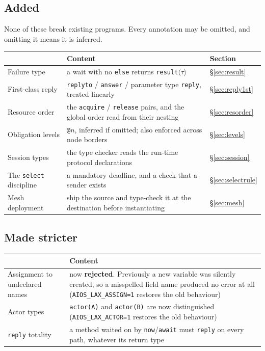 \documentclass[11pt,a4paper]{article}
\begin{document}
\subsection{Added}

None of these break existing programs. Every annotation may be omitted, and
omitting it means it is inferred.

\begin{center}
\small
\begin{tabular}{@{}lp{7.4cm}l@{}}
\toprule
 & Content & Section \\
\midrule
Failure type & a wait with no \texttt{else} returns \texttt{result}$\langle\tau\rangle$
  & \S\ref{sec:result} \\
First-class reply & \texttt{replyto} / \texttt{answer} / parameter type \texttt{reply}, treated linearly
  & \S\ref{sec:reply1st} \\
Resource order & the \texttt{acquire} / \texttt{release} pairs, and the global order read from their nesting
  & \S\ref{sec:resorder} \\
Obligation levels & \texttt{@$n$}, inferred if omitted; also enforced across node borders
  & \S\ref{sec:levels} \\
Session types & the type checker reads the run-time protocol declarations
  & \S\ref{sec:session} \\
The \texttt{select} discipline & a mandatory deadline, and a check that a sender exists
  & \S\ref{sec:selectrule} \\
Mesh deployment & ship the source and type-check it at the destination before instantiating
  & \S\ref{sec:mesh} \\
\bottomrule
\end{tabular}
\end{center}

\subsection{Made stricter}

\begin{center}
\small
\begin{tabular}{@{}lp{8.6cm}@{}}
\toprule
 & Content \\
\midrule
Assignment to undeclared names & now \textbf{rejected}. Previously a new
  variable was silently created, so a misspelled field name produced no error
  at all (\texttt{AIOS\_LAX\_ASSIGN=1} restores the old behaviour) \\
Actor types & \texttt{actor(A)} and \texttt{actor(B)} are now distinguished
  (\texttt{AIOS\_LAX\_ACTOR=1} restores the old behaviour) \\
\texttt{reply} totality & a method waited on by \texttt{now}/\texttt{await}
  must \texttt{reply} on every path, whatever its return type \\
\bottomrule
\end{tabular}
\end{center}
\end{document}
